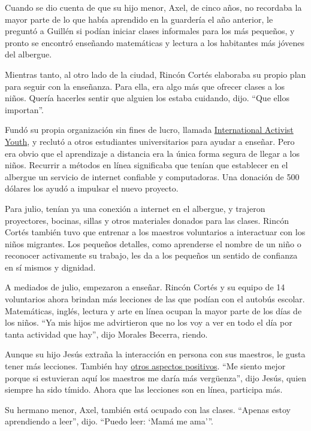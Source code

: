 Cuando se dio cuenta de que su hijo menor, Axel, de cinco años, no
recordaba la mayor parte de lo que había aprendido en la guardería el
año anterior, le preguntó a Guillén si podían iniciar clases informales
para los más pequeños, y pronto se encontró enseñando matemáticas y
lectura a los habitantes más jóvenes del albergue.

Mientras tanto, al otro lado de la ciudad, Rincón Cortés elaboraba su
propio plan para seguir con la enseñanza. Para ella, era algo más que
ofrecer clases a los niños. Quería hacerles sentir que alguien los
estaba cuidando, dijo. ``Que ellos importan''.

Fundó su propia organización sin fines de lucro, llamada
\href{https://www.internationalactivistyouth.com/}{International
Activist Youth}, y reclutó a otros estudiantes universitarios para
ayudar a enseñar. Pero era obvio que el aprendizaje a distancia era la
única forma segura de llegar a los niños. Recurrir a métodos en línea
significaba que tenían que establecer en el albergue un servicio de
internet confiable y computadoras. Una donación de 500 dólares los ayudó
a impulsar el nuevo proyecto.

Para julio, tenían ya una conexión a internet en el albergue, y trajeron
proyectores, bocinas, sillas y otros materiales donados para las clases.
Rincón Cortés también tuvo que entrenar a los maestros voluntarios a
interactuar con los niños migrantes. Los pequeños detalles, como
aprenderse el nombre de un niño o reconocer activamente su trabajo, les
da a los pequeños un sentido de confianza en sí mismos y dignidad.

A mediados de julio, empezaron a enseñar. Rincón Cortés y su equipo de
14 voluntarios ahora brindan más lecciones de las que podían con el
autobús escolar. Matemáticas, inglés, lectura y arte en línea ocupan la
mayor parte de los días de los niños. ``Ya mis hijos me advirtieron que
no los voy a ver en todo el día por tanta actividad que hay'', dijo
Morales Becerra, riendo.

Aunque su hijo Jesús extraña la interacción en persona con sus maestros,
le gusta tener más lecciones. También hay
\href{https://www.nytimes3xbfgragh.onion/2020/05/20/nyregion/coronavirus-students-schools.html}{otros
aspectos positivos}. ``Me siento mejor porque si estuvieran aquí los
maestros me daría más vergüenza'', dijo Jesús, quien siempre ha sido
tímido. Ahora que las lecciones son en línea, participa más.

Su hermano menor, Axel, también está ocupado con las clases. ``Apenas
estoy aprendiendo a leer'', dijo. ``Puedo leer: `Mamá me ama'''.

